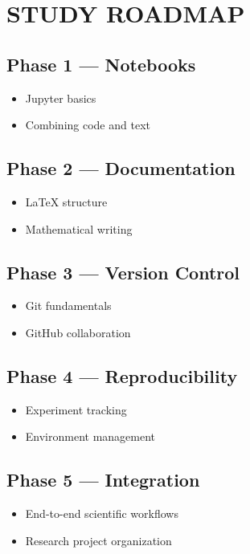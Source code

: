 \vspace{0.5cm}

\section*{STUDY ROADMAP}

\subsection*{Phase 1 --- Notebooks}
\begin{itemize}
\item Jupyter basics
\item Combining code and text
\end{itemize}

\subsection*{Phase 2 --- Documentation}
\begin{itemize}
\item LaTeX structure
\item Mathematical writing
\end{itemize}

\subsection*{Phase 3 --- Version Control}
\begin{itemize}
\item Git fundamentals
\item GitHub collaboration
\end{itemize}

\subsection*{Phase 4 --- Reproducibility}
\begin{itemize}
\item Experiment tracking
\item Environment management
\end{itemize}

\subsection*{Phase 5 --- Integration}
\begin{itemize}
\item End-to-end scientific workflows
\item Research project organization
\end{itemize}